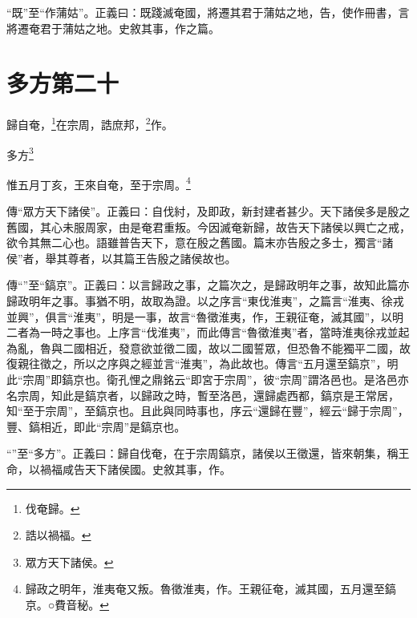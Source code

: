 {\noindent\shu{}\fzkt “既”至“作蒲姑”。正義曰：既踐滅奄國，將遷其君于蒲姑之地，告，使作冊書，言將遷奄君于蒲姑之地。史敘其事，作之篇。 \par}

\section{多方第二十}


歸自奄，\footnote{伐奄歸。}在宗周，誥庶邦，\footnote{誥以禍福。}作。

多方\footnote{眾方天下諸侯。}

惟五月丁亥，王來自奄，至于宗周。\footnote{歸政之明年，淮夷奄又叛。魯徵淮夷，作。王親征奄，滅其國，五月還至鎬京。○費音秘。}

{\noindent\zhuan{}\fzbyks 傳“眾方天下諸侯”。正義曰：自伐紂，及即政，新封建者甚少。天下諸侯多是殷之舊國，其心未服周家，由是奄君重叛。今因滅奄新歸，故告天下諸侯以興亡之戒，欲令其無二心也。語雖普告天下，意在殷之舊國。篇末亦告殷之多士，獨言“諸侯”者，舉其尊者，以其篇王告殷之諸侯故也。 \par}

{\noindent\zhuan{}\fzbyks 傳“”至“鎬京”。正義曰：以言歸政之事，之篇次之，是歸政明年之事，故知此篇亦歸政明年之事。事猶不明，故取為證。以之序言“東伐淮夷”，之篇言“淮夷、徐戎並興”，俱言“淮夷”，明是一事，故言“魯徵淮夷，作，王親征奄，滅其國”，以明二者為一時之事也。上序言“伐淮夷”，而此傳言“魯徵淮夷”者，當時淮夷徐戎並起為亂，魯與二國相近，發意欲並徵二國，故以二國誓眾，但恐魯不能獨平二國，故復親往徵之，所以之序與之經並言“淮夷”，為此故也。傳言“五月還至鎬京”，明此“宗周”即鎬京也。衛孔悝之鼎銘云“即宮于宗周”，彼“宗周”謂洛邑也。是洛邑亦名宗周，知此是鎬京者，以歸政之時，暫至洛邑，還歸處西都，鎬京是王常居，知“至于宗周”，至鎬京也。且此與同時事也，序云“還歸在豐”，經云“歸于宗周”，豐、鎬相近，即此“宗周”是鎬京也。 \par}

{\noindent\shu{}\fzkt “”至“多方”。正義曰：歸自伐奄，在于宗周鎬京，諸侯以王徵還，皆來朝集，稱王命，以禍福咸告天下諸侯國。史敘其事，作。 \par}

